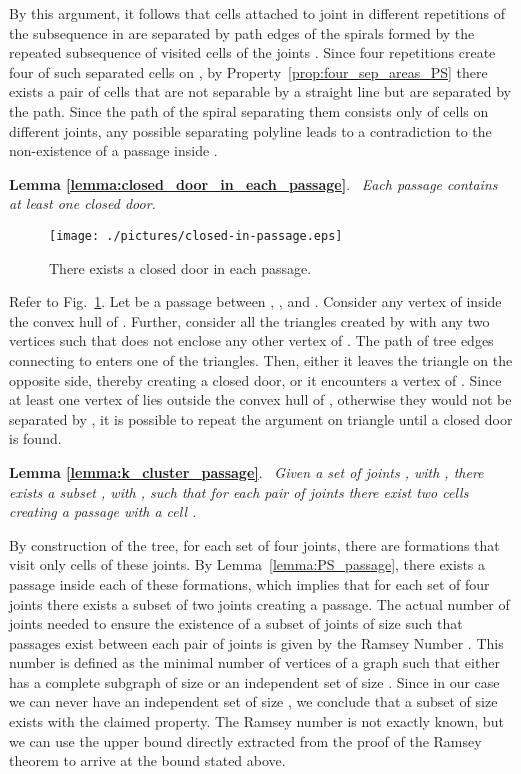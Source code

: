\documentclass[a4paper,10pt]{llncs}
\newcounter{prop}
\renewenvironment{proof}
{{\bf Proof:}}{\hspace*{\fill}\par\vspace{2mm}}
\newcommand{\rephrase}[3]{\noindent\textbf{#1 #2}.~\emph{#3}}
\begin{document}
\begin{proof}
By this argument, it follows that cells attached to joint  in different repetitions of the subsequence  in  are separated by path edges of the spirals formed by the repeated subsequence of visited cells of the joints . Since four repetitions create four of such separated cells on , by Property~\ref{prop:four_sep_areas_PS} there exists a pair of cells that are not separable by a straight line but are separated by the path. Since the path of the spiral separating them consists only of cells on different joints, any possible separating polyline leads to a contradiction to the non-existence of a passage inside .
\end{proof}

\rephrase{Lemma}{\ref{lemma:closed_door_in_each_passage}}{
Each passage contains at least one closed door.
}

\begin{figure}[ht]
\begin{center}
\texttt{[image: ./pictures/closed-in-passage.eps]}
\caption{There exists a closed door in each passage.}
\label{fig:closed_door_in_passage}
\end{center}
\end{figure}
\begin{proof}
Refer to Fig.~\ref{fig:closed_door_in_passage}. Let  be a passage between , , and . Consider any vertex  of  inside the convex hull of . Further, consider all the triangles  created by  with any two vertices  such that  does not enclose any other vertex of . The path of tree edges connecting  to  enters one of the triangles. Then, either it leaves the triangle on the opposite side, thereby creating a closed door, or it encounters a vertex  of . Since at least one vertex of  lies outside the convex hull of , otherwise they would not be separated by , it is possible to repeat the argument on triangle  until a closed door is found.
\end{proof}

\rephrase{Lemma}{\ref{lemma:k_cluster_passage}}{
Given a set of joints , with , there exists a subset , with , such that for each pair of joints  there exist two cells  creating a passage with a cell .
}

\begin{proof}
By construction of the tree, for each set of four joints, there are formations that visit only cells of these joints. By Lemma~\ref{lemma:PS_passage}, there exists a passage inside each of these formations, which implies that for each set of four joints there exists a subset of two joints creating a passage.
The actual number of joints needed to ensure the existence of a subset of joints of size  such that passages exist between each pair of joints is given by the Ramsey Number . This number is defined as the minimal number of vertices of a graph  such that  either has a complete subgraph of size  or an independent set of size . Since in our case we can never have an independent set of size , we conclude that a subset of size  exists with the claimed property. The Ramsey number  is not exactly known, but we can use the upper bound directly extracted from the proof of the Ramsey theorem to arrive at the bound stated above. \cite{grs-rt-90}
\end{proof}
\end{document}
